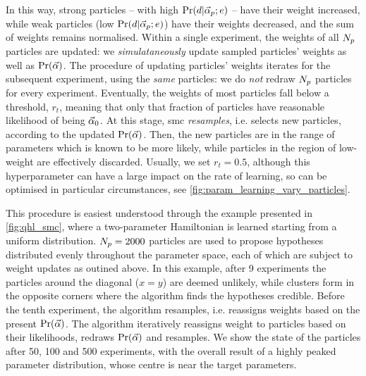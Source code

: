 In this way, strong particles -- with high $\Pr(d | \vec{\alpha}_p; e)$ -- have their weight increased, 
    while weak particles (low $\Pr(d | \vec{\alpha}_p; e)$) have their weights decreased, 
    and the sum of weights remains normalised. 
Within a single experiment, the weights of all $N_p$ particles are updated:
    we \emph{simulataneously} update sampled particles' weights as well as $\Pr(\vec{\alpha})$. 
The procedure of updating particles' weights iterates for the subsequent experiment, using the \emph{same} particles: 
    we do \emph{not} redraw $N_p$ particles for every experiment.
Eventually, the weights of most particles fall below a threshold, $r_t$, 
    meaning that only that fraction of particles have reasonable \gls{likelihood} of being $\vec{\alpha}_0$.
At this stage, \gls{smc} \emph{resamples}, i.e. selects new particles, according to the updated $\Pr(\vec{\alpha})$\footnotemark.
Then, the new particles are in the range of parameters which is known to be more likely, 
    while particles in the region of low-weight are effectively discarded. 
Usually, we set $r_t=0.5$, although this \gls{hyperparameter} can have a large impact 
    on the rate of learning, so can be optimised in particular circumstances, 
    see \cref{fig:param_learning_vary_particles}.
\par 
This procedure is easiest understood through the example presented in \cref{fig:qhl_smc}, 
    where a two-parameter Hamiltonian is learned starting from a uniform distribution. 
$N_p=2000$ particles are used to propose hypotheses distributed evenly throughout the parameter space, 
    each of which are subject to weight updates as outined above. 
In this example, after 9 experiments the particles around the diagonal ($x=y$) are deemed unlikely, 
    while clusters form in the opposite corners where the algorithm finds the hypotheses credible. 
Before the tenth experiment, the algorithm resamples, i.e. reassigns weights based on the present $\Pr(\vec{\alpha})$. 
The algorithm iteratively reassigns weight to particles based on their likelihoods, redraws $\Pr(\vec{\alpha})$ and resamples. 
We show the state of the particles after 50, 100 and 500 experiments,
    with the overall result of a highly peaked parameter distribution, 
    whose centre is near the target parameters. 


